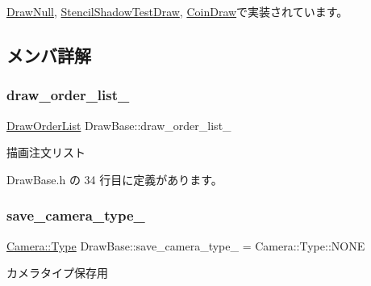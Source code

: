 \mbox{\hyperlink{class_draw_null_a3baf78b024837c8ebb2471e7505db6ea}{Draw\+Null}}, \mbox{\hyperlink{class_stencil_shadow_test_draw_a0f697b6dad67048c7f8916a53cca6b1c}{Stencil\+Shadow\+Test\+Draw}}, \mbox{\hyperlink{class_coin_draw_a66c03acd675ac1820977cb21015abfdb}{Coin\+Draw}}で実装されています。



\subsection{メンバ詳解}
\mbox{\label{class_draw_base_a6ebc8dc96176ddd3bd984b3d54739adb}} 
\subsubsection{\texorpdfstring{draw\+\_\+order\+\_\+list\+\_\+}{draw\_order\_list\_}}
{\footnotesize\ttfamily \mbox{\hyperlink{class_draw_order_list}{Draw\+Order\+List}} Draw\+Base\+::draw\+\_\+order\+\_\+list\+\_\+\hspace{0.3cm}{\ttfamily [private]}}



描画注文リスト 



 Draw\+Base.\+h の 34 行目に定義があります。

\mbox{\label{class_draw_base_aa8be4980756a0af7cc76dfe455c492d4}} 
\subsubsection{\texorpdfstring{save\+\_\+camera\+\_\+type\+\_\+}{save\_camera\_type\_}}
{\footnotesize\ttfamily \mbox{\hyperlink{class_camera_a3b0a1f58deca679ac665f61c480d1dcb}{Camera\+::\+Type}} Draw\+Base\+::save\+\_\+camera\+\_\+type\+\_\+ = Camera\+::\+Type\+::\+N\+O\+NE\hspace{0.3cm}{\ttfamily [private]}}



カメラタイプ保存用 



